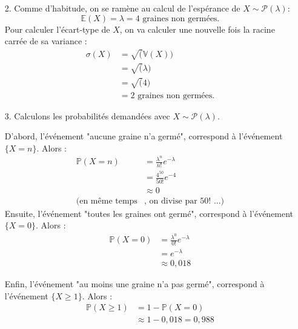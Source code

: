 \documentclass[a4paper,oneside,12pt]{article}
\theoremstyle{plain}
\def\V{\mathbb{V}}
\def\P{{\mathbb P}}
\def\E{{\mathbb E}}
\begin{document}
\begin{enumerate}
    \item[2.] Comme d'habitude, on se ramène au calcul de l'espérance de $X \sim \mathcal{P}(\lambda)$:
    $$\E(X) = \lambda = 4 \mbox{ graines non germées.}$$
    Pour calculer l'écart-type de $X$, on va calculer une nouvelle fois la racine carrée de sa variance :
   \begin{align*}
       \sigma(X) &= \sqrt(\V(X)) \\
       &= \sqrt(\lambda)\\
       &= \sqrt(4)\\
       &= 2 \mbox{ graines non germées.}
   \end{align*}
   
   \item[3.] Calculons les probabilités demandées avec $X \sim \mathcal{P}(\lambda)$. 
   

    D'abord, l'événement "aucune graine n'a germé", correspond à l'événement $\{X = n\}$. Alors :
   \begin{align*}
       \P(X = n) &= \frac{\lambda^n}{n!}e^{-\lambda}\\
       &= \frac{4^{50}}{50!}e^{-4}\\
       &\approx 0\\
       \mbox{(en même temps}&\mbox{, on divise par } 50! \mbox{ ...)}
   \end{align*}
   Ensuite, l'événement "toutes les graines ont germé", correspond à l'événement $\{X = 0\}$. Alors :
   \begin{align*}
       \P(X = 0) &= \frac{\lambda^0}{0!}e^{-\lambda}\\
       &= e^{-\lambda}\\
       &\approx 0,018
   \end{align*}
   
   Enfin, l'événement "au moins une graine n'a pas germé", correspond à l'événement $\{X \ge 1\}$. Alors :
   \begin{align*}
       \P(X \ge 1) &= 1 - \P(X =0) \\
       &\approx 1- 0,018 = 0,988
   \end{align*}
\end{enumerate}
\end{document}
